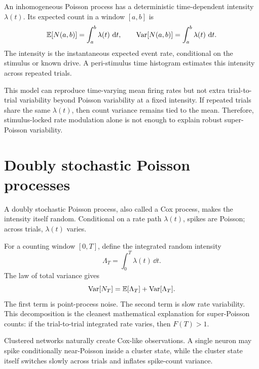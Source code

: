 An inhomogeneous Poisson process has a deterministic time-dependent intensity $\lambda(t)$. Its expected count in a window $[a,b]$ is
%
\begin{equation}
  \mathbb{E}[N(a,b)] = \int_a^b \lambda(t)\,\mathop{}\!\mathrm{d} t,
  \qquad
  \operatorname{Var}[N(a,b)] = \int_a^b \lambda(t)\,\mathop{}\!\mathrm{d} t.
  \label{eq:inhomogeneous-poisson-moments}
\end{equation}
%
The intensity is the instantaneous expected event rate, conditional on the stimulus or known drive. A peri-stimulus time histogram estimates this intensity across repeated trials.

This model can reproduce time-varying mean firing rates but not extra trial-to-trial variability beyond Poisson variability at a fixed intensity. If repeated trials share the same $\lambda(t)$, then count variance remains tied to the mean. Therefore, stimulus-locked rate modulation alone is not enough to explain robust super-Poisson variability.

\section{Doubly stochastic Poisson processes}
\label{sec:doubly-stochastic-poisson}

A doubly stochastic Poisson process, also called a Cox process, makes the intensity itself random. Conditional on a rate path $\lambda(t)$, spikes are Poisson; across trials, $\lambda(t)$ varies.

For a counting window $[0,T]$, define the integrated random intensity
%
\begin{equation}
  \Lambda_T = \int_0^T \lambda(t)\,\dd t.
  \label{eq:integrated-random-intensity}
\end{equation}
%
The law of total variance gives
%
\begin{equation}
  \operatorname{Var}[N_T]
  =
  \mathbb{E}[\Lambda_T] + \operatorname{Var}[\Lambda_T].
  \label{eq:ch19-cox-total-variance}
\end{equation}
%
The first term is point-process noise. The second term is slow rate variability. This decomposition is the cleanest mathematical explanation for super-Poisson counts: if the trial-to-trial integrated rate varies, then $F(T)>1$.

Clustered networks naturally create Cox-like observations. A single neuron may spike conditionally near-Poisson inside a cluster state, while the cluster state itself switches slowly across trials and inflates spike-count variance.

